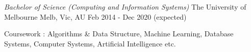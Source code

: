 


\begin{cventries}


\cventry
{\textit{Bachelor of Science (Computing and Information Systems)}} %
{The University of Melbourne} %
{Melb, Vic, AU} %
{Feb 2014 - Dec 2020 (expected)} %
{ %
\begin{cvitems}
\item {Coursework : Algorithms \& Data Structure, Machine Learning, Database Systems, Computer Systems, Artificial Intelligence etc. }
\end{cvitems}
}


\end{cventries}